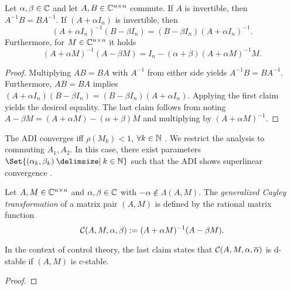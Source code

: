 \begin{lemma}
\label{thm:adi:commuting-matrices}
  Let $\alpha, \beta\in\mathbb{C}$ and let $A, B \in\mathbb{C}^{n\times n}$ commute.
  If $A$ is invertible, then $A^{-1}B = BA^{-1}$.
  If $(A+\alpha I_n)$ is invertible, then
  \begin{equation*}
    (A+\alpha I_n)^{-1} (B-\beta I_n)
    = (B-\beta I_n) (A+\alpha I_n)^{-1}
    .
  \end{equation*}
  Furthermore, for $M\in\mathbb{C}^{n\times n}$ it holds
  \begin{equation*}
    (A+\alpha M)^{-1} (A-\beta M)
    = I_n - (\alpha+\beta) (A+\alpha M)^{-1} M
    .
  \end{equation*}
\end{lemma}
\begin{proof}
  Multiplying $AB=BA$ with $A^{-1}$ from either side yields $A^{-1}B=BA^{-1}$.
  Furthermore, $AB=BA$ implies
  $
    (A+\alpha I_n) (B-\beta I_n)
    =
    (B-\beta I_n) (A+\alpha I_n)
  $.
  Applying the first claim yields the desired equality.
  The last claim follows from noting
  $A-\beta M = (A+\alpha M) - (\alpha+\beta)M$
  and multiplying by $(A+\alpha M)^{-1}$.
\end{proof}

The \ac{ADI} converges iff $\rho(M_k) < 1$, $\forall k\in\mathbb{N}$ \cite[Theorem~11.2.1]{Golub2013}.
We restrict the analysis to commuting $A_1, A_2$.
In this case,
there exist parameters $\Set{(\alpha_k, \beta_k) \given k\in\N}$
such that the \ac{ADI} shows
superlinear convergence \cite{Beckermann2010}.

\begin{lemma}
\label{thm:adi:cayley}
  Let $A, M\in\mathbb{C}^{n\times n}$ and $\alpha, \beta \in\mathbb{C}$ with $-\alpha\notin\Lambda(A, M)$.
  The \emph{generalized Cayley transformation} of a matrix pair $(A,M)$ is defined by
  the rational matrix function
  \begin{equation*}
    \mathcal{C}(A, M, \alpha, \beta) := (A+\alpha M)^{-1} (A-\beta M).
  \end{equation*}
\end{lemma}
\begin{remark}
  In the context of control theory,
  the last claim states that
  $\Cayley(A, M, \alpha, \conj\alpha)$ is d-stable if
  $(A, M)$ is c-stable.
\end{remark}
\begin{proof}
\end{proof}


